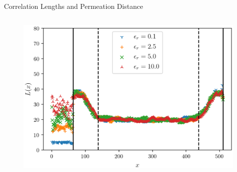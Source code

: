 \documentclass{beamer}
\begin{document}
\begin{frame}[t]{Correlation Lengths and Permeation Distance}
\begin{columns}
\begin{column}{0.7\textwidth}
                \begin{figure}[h]
                    \centering
                    \includegraphics[height=0.72\textheight]{images/correlation_lengths.png}
                    \hspace{-30pt}
                    \label{fig:correlation_length}
                \end{figure}
            \end{column}
        \end{columns}
    \end{frame}





\end{document}
